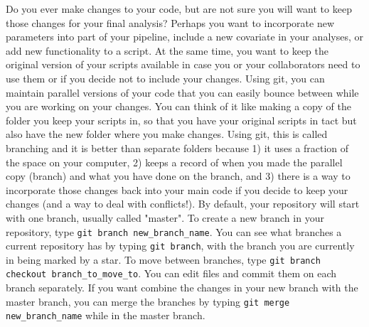 Do you ever make changes to your code, but are not sure you will want to keep those changes for your final analysis? Perhaps you want to incorporate new parameters into part of your pipeline, include a new covariate in your analyses, or add new functionality to a script. At the same time, you want to keep the original version of your scripts available in case you or your collaborators need to use them or if you decide not to include your changes. Using git, you can maintain parallel versions of your code that you can easily bounce between while you are working on your changes. You can think of it like making a copy of the folder you keep your scripts in, so that you have your original scripts in tact but also have the new folder where you make changes. Using git, this is called branching and it is better than separate folders because 1) it uses a fraction of the space on your computer, 2) keeps a record of when you made the parallel copy (branch) and what you have done on the branch, and 3) there is a way to incorporate those changes back into your main code if you decide to keep your changes (and a way to deal with conflicts!). By default, your repository will start with one branch, usually called "master". To create a new branch in your repository, type \verb|git branch new_branch_name|. You can see what branches a current repository has by typing \verb|git branch|, with the branch you are currently in being marked by a star. To move between branches, type \verb|git branch checkout branch_to_move_to|. You can edit files and commit them on each branch separately. If you want combine the changes in your new branch with the master branch, you can merge the branches by typing \verb|git merge new_branch_name| while in the master branch. 